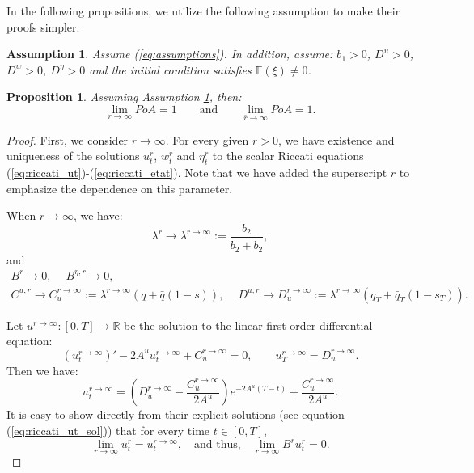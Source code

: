 \documentclass[11pt]{article}
\newtheorem{proposition}{Proposition}
\newtheorem{assumption}{Assumption}
\begin{document}
\noindent In the following propositions, we utilize the following assumption to make their proofs simpler.	
\begin{assumption}\label{assumption}
	Assume (\ref{eq:assumptions}). In addition, assume: $b_1 > 0$, $D^{u} > 0$, $D^w > 0$, $D^{\eta} >0$ and the initial condition satisfies $\mathbb{E}(\xi) \neq 0$.
\end{assumption}

\begin{proposition}
	Assuming Assumption \ref{assumption}, then:
	\begin{equation*}
			\lim_{r \to \infty} PoA = 1 \qquad \text{and} \qquad
			\lim_{\bar{r} \to \infty} PoA = 1.
	\end{equation*}
	\label{prop:r_bar_r}
\end{proposition}
\begin{proof}
	First, we consider $r \to \infty$. For every given $r >0$, we have existence and uniqueness of the solutions $u^{r}_t$, $w^{r}_t$ and $\eta^{r}_t$ to the scalar Riccati equations (\ref{eq:riccati_ut})-(\ref{eq:riccati_etat}). Note that we have added the superscript $r$ to emphasize the dependence on this parameter. 
	
	When $r \to \infty$, we have:
	\begin{equation*}
		\lambda^r \longrightarrow \lambda^{r\to\infty} := \frac{b_2}{b_2 + \bar{b}_2},
	\end{equation*}
	and
	\begin{equation*}
	\begin{array}{l}
		B^r \longrightarrow 0,\quad \ B^{\eta,r} \longrightarrow 0,\\
		C^{u,r} \longrightarrow C_u^{r\to \infty} := \lambda^{r \to \infty}(q + \bar{q}(1-s)),\quad \ D^{u,r} \to D_u^{r \to \infty} := \lambda^{r \to \infty}(q_T+ \bar{q}_T(1-s_T)).
	\end{array}
	\end{equation*}

	Let $u^{r \to \infty}:[0,T] \to \mathbb{R}$ be the solution to the linear first-order differential equation:
	\begin{equation*}
		\left({u}^{r \to \infty}_t\right)' - 2A^u u_t^{r \to \infty} + C^{r \to \infty}_u = 0, \qquad u_T^{r \to \infty} = D^{r \to \infty}_u.
	\end{equation*}
	Then we have:
	\begin{equation*}
	u_t^{r \to \infty} = \left(D^{r \to \infty}_u - \frac{C^{r \to \infty}_u}{2A^u} \right) e^{-2A^u (T-t)} +  \frac{C^{r \to \infty}_u}{2A^u}.
	\end{equation*}
	It is easy to show directly from their explicit solutions (see equation (\ref{eq:riccati_ut_sol})) that for every time $t\in [0,T]$, $$\lim_{r \to \infty}u^r_t=u^{r \to \infty}_t, \quad \text{and thus,} \quad \lim_{r \to \infty}B^ru^r_t=0.$$
	

\end{proof}
\end{document}
